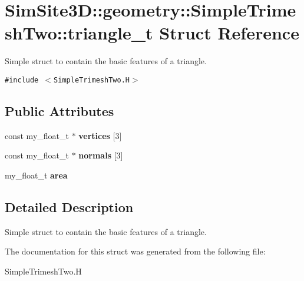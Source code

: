 \section{SimSite3D::geometry::Simple\-Trimesh\-Two::triangle\_\-t Struct Reference}
\label{structSimSite3D_1_1geometry_1_1SimpleTrimeshTwo_1_1triangle__t}
Simple struct to contain the basic features of a triangle.  


{\tt \#include $<$Simple\-Trimesh\-Two.H$>$}

\subsection*{Public Attributes}
\begin{CompactItemize}
\item 
const my\_\-float\_\-t $\ast$ \textbf{vertices} [3]\label{structSimSite3D_1_1geometry_1_1SimpleTrimeshTwo_1_1triangle__t_40bf671476d2bf5b08a24073b81aa206}

\item 
const my\_\-float\_\-t $\ast$ \textbf{normals} [3]\label{structSimSite3D_1_1geometry_1_1SimpleTrimeshTwo_1_1triangle__t_0b7eb4d1a6f692324da8a703681e4cfc}

\item 
my\_\-float\_\-t \textbf{area}\label{structSimSite3D_1_1geometry_1_1SimpleTrimeshTwo_1_1triangle__t_27b8a68ae795adf52ba95a1b90cc0c6b}

\end{CompactItemize}


\subsection{Detailed Description}
Simple struct to contain the basic features of a triangle. 



The documentation for this struct was generated from the following file:\begin{CompactItemize}
\item 
Simple\-Trimesh\-Two.H\end{CompactItemize}

